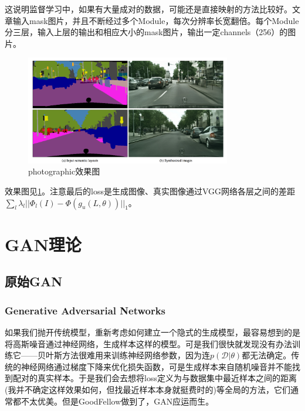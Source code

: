 \documentclass[a4paper]{article}
\begin{document}
这说明监督学习中，如果有大量成对的数据，可能还是直接映射的方法比较好。文章输入mask图片，并且不断经过多个Module，每次分辨率长宽翻倍。每个Module分三层，输入上层的输出和相应大小的mask图片，输出一定channels（256）的图片。
\begin{figure}
\centering
\includegraphics[width=0.8\textwidth]{./img/41.png}
\caption{photographic效果图}
\label{fig:41}
\end{figure}
效果图见\ref{fig:41}。注意最后的loss是生成图像、真实图像通过VGG网络各层之间的差距$\sum_l \lambda_l||\Phi_l(I)-\Phi(g_u(L,\theta))||_1$。
\section{GAN理论}
\subsection{原始GAN}
\subsubsection{Generative Adversarial Networks\cite{gan}}
如果我们抛开传统模型，重新考虑如何建立一个隐式的生成模型，最容易想到的是将高斯噪音通过神经网络，生成样本这样的模型。可是我们很快就发现没有办法训练它——贝叶斯方法很难用来训练神经网络参数，因为连$p(\mathcal{D}|\theta)$都无法确定。传统的神经网络通过梯度下降来优化损失函数，可是生成样本来自随机噪音并不能找到配对的真实样本。于是我们会去想将loss定义为与数据集中最近样本之间的距离(我并不确定这样效果如何，但找最近样本本身就挺费时的)等全局的方法，它们通常都不太优美。但是GoodFellow做到了，GAN应运而生。
\end{document}
